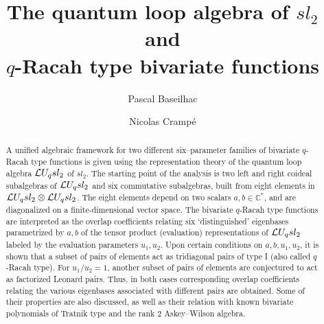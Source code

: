 \documentclass[11pt]{amsart}
\numberwithin{equation}{section}
\numberwithin{equation}{section}
\begin{document}
    \newcommand{\calW}{\mathcal{W}}
    \newcommand{\calG}{\mathcal{G}}

	\newcommand{\ds}{\mathds}
	
	\newcommand{\futt}{{\langle 23 \rangle} }
	\newcommand{\sfu}{{\langle 34 \rangle} }
	
	\newcommand{\CE}{\cal{E} }
	\newcommand{\CF}{\cal{F} }
	\newcommand{\CH}{\cal{H} }
	\newcommand{\CW}{\cal{W}}
	
	
	\newcommand{\aw}{\mathbf{aw}}
\newcommand{\saw}{\mathbf{saw}}


	\allowdisplaybreaks
	
		
	\makeatletter
	\def\@textbottom{\vskip \z@ \@plus 1pt}
	\let\@texttop\relax
	\makeatother
	

	\title[$\Loop$ and bivariate functions]{The quantum loop algebra of $sl_2$ and
     \\ $q$-Racah type bivariate functions}
	\author{Pascal Baseilhac}
	\author{Nicolas  Cramp\'e}
	\address{Institut Denis-Poisson CNRS/UMR 7013 - Universit\'e de Tours -
    Universit\'e d'Orl\'eans,
		Parc de Grammont, 37200 Tours, 
		FRANCE}
	

	\begin{abstract}
    A unified algebraic framework for two different six--parameter families  of bivariate $q$-Racah type functions is given using the representation theory of the quantum loop algebra $\Loop$ of $sl_2$. The starting point of the analysis is two left and right coideal subalgebras of $\Loop$ and six commutative subalgebras, built from eight elements in $\mathcal{L} U_q sl_2 \otimes \mathcal{L} U_q sl_2$.
The eight elements depend on two scalars $a,b \in {\mathbb C}^*$, and are diagonalized on a finite-dimensional vector space. 
The bivariate $q$-Racah type functions are interpreted as the overlap coefficients relating six `distinguished' eigenbases parametrized by $a,b$ 
 of the tensor product (evaluation) representations of $\Loop$ labeled by the evaluation parameters $u_1,u_2$.
Upon certain conditions on $a,b,u_1,u_2$, it is shown that a subset of pairs of elements act as tridiagonal pairs of type I (also called $q$-Racah type). 
For $u_1/u_2=1$, another subset of pairs of elements are conjectured to act as factorized Leonard pairs. 
Thus, in both cases corresponding overlap coefficients relating the various eigenbases associated with different pairs are obtained. Some of their properties are also discussed, as well as  their relation with known bivariate polynomials of Tratnik type and the rank $2$ Askey--Wilson algebra.
	\end{abstract}
	
\end{document}
